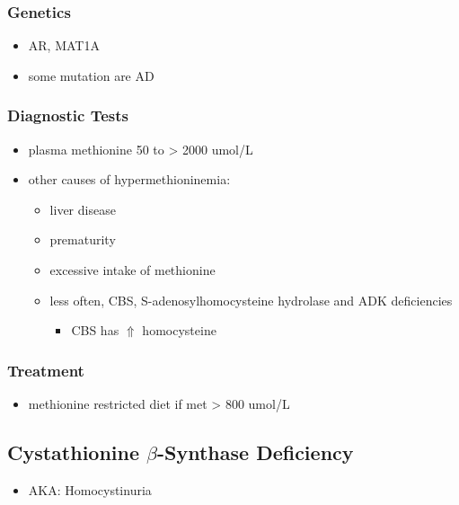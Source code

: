 \documentclass{scrartcl}
\begin{document}
\subsubsection{Genetics}
\label{sec:orgc23aac7}
\begin{itemize}
\item AR, MAT1A
\item some mutation are AD
\end{itemize}
\subsubsection{Diagnostic Tests}
\label{sec:orgd96fca5}
\begin{itemize}
\item plasma methionine 50 to \textgreater{} 2000 umol/L
\item other causes of hypermethioninemia:
\begin{itemize}
\item liver disease
\item prematurity
\item excessive intake of methionine
\item less often, CBS, S-adenosylhomocysteine hydrolase and ADK deficiencies
\begin{itemize}
\item CBS has \(\Uparrow\) homocysteine
\end{itemize}
\end{itemize}
\end{itemize}
\subsubsection{Treatment}
\label{sec:org145f4f4}
\begin{itemize}
\item methionine restricted diet if met \textgreater{} 800 umol/L
\end{itemize}

\subsection{Cystathionine \(\beta\)-Synthase Deficiency}
\label{sec:orgf89b36c}
\begin{itemize}
\item AKA: Homocystinuria
\end{itemize}
\end{document}
